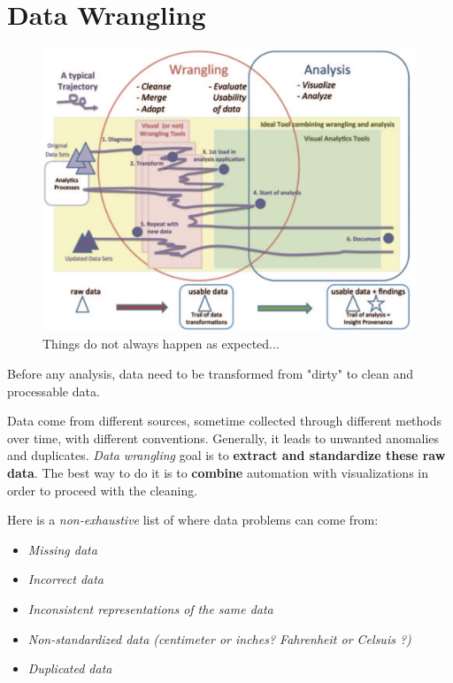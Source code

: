 
\section{Data Wrangling}

\begin{figure}[H]%
 \centering
 \includegraphics[width=12cm]{./img/03/path_data_wrangling}
 \caption{\label{path_data_wrangling}Things do not always happen as expected...}
\end{figure}

Before any analysis, data need to be transformed from "dirty" to clean and processable data. 

Data come from different sources, sometime collected through different methods over time, with different conventions. Generally, it leads to unwanted anomalies and duplicates. \emph{Data wrangling} goal is to \textbf{extract and standardize these raw data}. The best way to do it is to \textbf{combine} automation with visualizations in order to proceed with the cleaning. 

Here is a \emph{non-exhaustive} list of where data problems can come from: 
\begin{itemize}
  \item \emph{Missing data}
  \item \emph{Incorrect data}
  \item \emph{Inconsistent representations of the same data}
  \item \emph{Non-standardized data (centimeter or inches? Fahrenheit or Celsuis ?)}
  \item \emph{Duplicated data}
\end{itemize}

